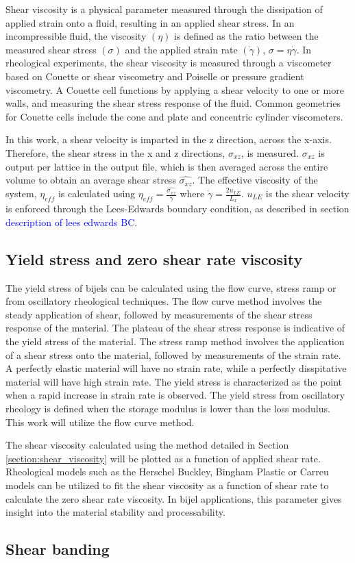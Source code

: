 Shear viscosity is a physical parameter measured through the dissipation of applied strain onto a fluid, resulting in 
an applied shear stress. In an incompressible fluid, the viscosity $(\eta)$ is defined as the ratio between the measured 
shear stress $(\sigma)$ and the applied strain rate $(\dot{\gamma})$, $\sigma = \eta \dot{\gamma}$. In rheological 
experiments, the shear viscosity is measured through a viscometer based on Couette or shear viscometry and Poiselle or 
pressure gradient viscometry. A Couette cell functions by applying a shear velocity to one or more walls, and measuring 
the shear stress response of the fluid. Common geometries for Couette cells include the cone and plate and concentric 
cylinder viscometers. 

In this work, a shear velocity is imparted in the z direction, across the x-axis. Therefore, the shear stress in the x 
and z directions, $\sigma_{xz}$, is measured. $\sigma_{xz}$ is output per lattice in the output file, which is then 
averaged across the entire volume to obtain an average shear stress $\hat{\sigma_{xz}}$. The effective viscosity of the 
system, $\eta_{eff}$ is calculated using $\eta_{eff} = \frac{\hat{\sigma_{xz}}}{\dot{\gamma}}$ where $\dot{\gamma} = 
\frac{2 u_{LE}}{L_x}$. $u_{LE}$ is the shear velocity is enforced through the Lees-Edwards boundary condition, as 
described in section \textcolor{blue}{description of lees edwards BC}.

\subsection{Yield stress and zero shear rate viscosity}
\label{section:yield_stress}

The yield stress of bijels can be calculated using the flow curve, stress ramp or from oscillatory rheological techniques. 
The flow curve method involves the steady application of shear, followed by measurements of the shear stress response of 
the material. The plateau of the shear stress response is indicative of the yield stress of the material. The stress ramp 
method involves the application of a shear stress onto the material, followed by measurements of the strain rate. A 
perfectly elastic material will have no strain rate, while a perfectly disspitative material will have high strain rate. 
The yield stress is characterized as the point when a rapid increase in strain rate is observed. The yield stress from 
oscillatory rheology is defined when the storage modulus is lower than the loss modulus. This work will utilize the flow 
curve method.

The shear viscosity calculated using the method detailed in Section \ref{section:shear_viscosity} will be plotted as a 
function of applied shear rate. Rheological models such as the Herschel Buckley, Bingham Plastic or Carreu models can be 
utilized to fit the shear viscosity as a function of shear rate to calculate the zero shear rate viscosity. In bijel 
applications, this parameter gives insight into the material stability and processability.

\subsection{Shear banding}
\label{section:yield_stress}